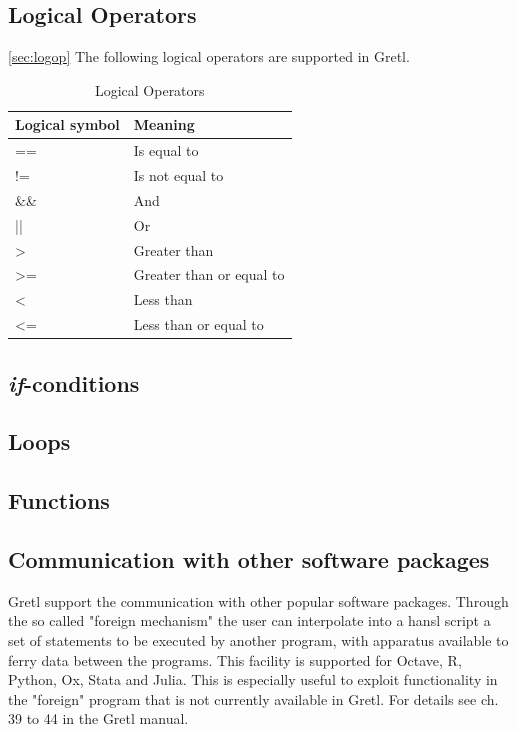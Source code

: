 \documentclass[11pt]{article}
\begin{document}
\subsection{Logical Operators}
\ref{sec:logop}
The following logical operators are supported in Gretl. 

\begin{table}[!h]
	\centering
	\footnotesize
	\begin{tabular}{ll}
		\hline
		Logical symbol & Meaning \\ 
		\hline 
		== & Is equal to \\
		!= & Is not equal to \\ 
		\&\& & And \\
		|| & Or \\
		> & Greater than \\
		>= & Greater than or equal to \\
		< & Less than \\
		<= & Less than or equal to \\
		\hline 
	\end{tabular}
	\caption{Logical Operators}
	\label{tab:logic}
\end{table}

\subsection{\textit{if}-conditions}

\subsection{Loops}

\subsection{Functions}

\subsection{Communication with other software packages}
\label{sec:foreign}
Gretl support the communication with other popular software packages. Through the so called "foreign mechanism" the user can interpolate into a hansl script a set of statements to be executed by another program, with apparatus available to ferry data between the programs. This facility is supported for Octave, R, Python, Ox, Stata and Julia. This is especially useful to exploit functionality in the "foreign" program that is not currently available in Gretl. For details see ch. 39 to 44 in the Gretl manual.
\end{document}
